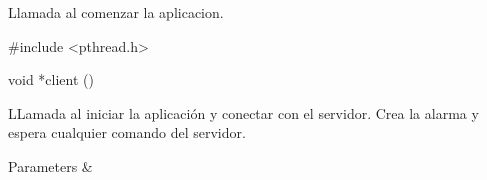 Llamada al comenzar la aplicacion.


\begin{DoxyCode}
\textcolor{preprocessor}{#include <pthread.h>}

\textcolor{keywordtype}{void} *client ()
\end{DoxyCode}


L\+Lamada al iniciar la aplicación y conectar con el servidor. Crea la alarma y espera cualquier comando del servidor.


\begin{DoxyParams}{Parameters}
{\em } & \\
\hline
\end{DoxyParams}
